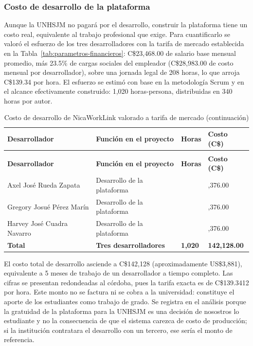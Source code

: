 \subsubsection{Costo de desarrollo de la plataforma}

Aunque la UNHSJM no pagará por el desarrollo, construir la plataforma tiene un costo real, equivalente al trabajo profesional que exige. Para cuantificarlo se valoró el esfuerzo de los tres desarrolladores con la tarifa de mercado establecida en la Tabla~\ref{tab:parametros-financieros}: C\$23,468.00 de salario base mensual promedio, más 23.5\% de cargas sociales del empleador (C\$28,983.00 de costo mensual por desarrollador), sobre una jornada legal de 208 horas, lo que arroja C\$139.34 por hora. El esfuerzo se estimó con base en la metodología Scrum y en el alcance efectivamente construido: 1,020 horas-persona, distribuidas en 340 horas por autor.

\begin{longtable}{@{}>{\raggedright\arraybackslash}p{5.2cm}>{\raggedright\arraybackslash}p{3.8cm}>{\raggedleft\arraybackslash}p{1.8cm}>{\raggedleft\arraybackslash}p{3.2cm}@{}}
\caption{Costo de desarrollo de NicaWorkLink valorado a tarifa de mercado}\label{tab:costo-desarrollo}\\
\hline
\textbf{Desarrollador} & \textbf{Función en el proyecto} & \textbf{Horas} & \textbf{Costo (C\$)} \\
\hline
\endfirsthead
\caption[]{Costo de desarrollo de NicaWorkLink valorado a tarifa de mercado (continuación)}\\
\hline
\textbf{Desarrollador} & \textbf{Función en el proyecto} & \textbf{Horas} & \textbf{Costo (C\$)} \\
\hline
\endhead
\hline
\endlastfoot
Axel José Rueda Zapata & Desarrollo de la plataforma & 340 & 47,376.00 \\
\hline
Gregory Josué Pérez Marín & Desarrollo de la plataforma & 340 & 47,376.00 \\
\hline
Harvey José Cuadra Navarro & Desarrollo de la plataforma & 340 & 47,376.00 \\
\hline
\textbf{Total} & \textbf{Tres desarrolladores} & \textbf{1,020} & \textbf{142,128.00} \\
\end{longtable}

El costo total de desarrollo asciende a C\$142,128 (aproximadamente US\$3,881), equivalente a 5 meses de trabajo de un desarrollador a tiempo completo. Las cifras se presentan redondeadas al córdoba, pues la tarifa exacta es de C\$139.3412 por hora. Este monto no se factura ni se cobra a la universidad: constituye el aporte de los estudiantes como trabajo de grado. Se registra en el análisis porque la gratuidad de la plataforma para la UNHSJM es una decisión de nosostros lo estudiante y no la consecuencia de que el sistema carezca de costo de producción; si la institución contratara el desarrollo con un tercero, ese sería el monto de referencia.
\clearpage

